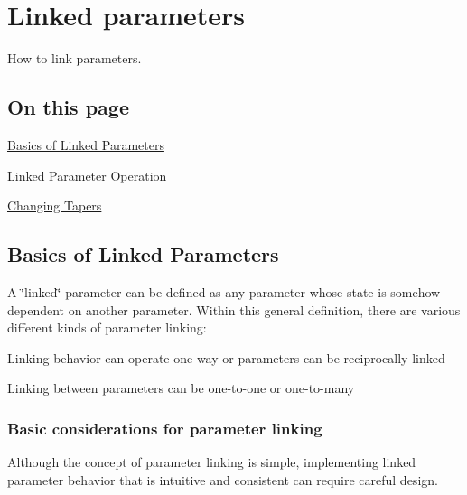 \hypertarget{a00354}{}\section{Linked parameters}
\label{a00354}
How to link parameters. 

\hypertarget{a00354_linkedParameters_contents}{}\subsection{On this page}\label{a00354_linkedParameters_contents}
\begin{DoxyItemize}
\item \hyperlink{a00354_linkedParameters_basics}{Basics of Linked Parameters} \item \hyperlink{a00354_linkedParameters_linkedParameterOperation}{Linked Parameter Operation} \item \hyperlink{a00354_linkedParameters_changingTapers}{Changing Tapers}\end{DoxyItemize}
\hypertarget{a00354_linkedParameters_basics}{}\subsection{Basics of Linked Parameters}\label{a00354_linkedParameters_basics}
A \char`\"{}linked\char`\"{} parameter can be defined as any parameter whose state is somehow dependent on another parameter. Within this general definition, there are various different kinds of parameter linking\+:


\begin{DoxyItemize}
\item Linking behavior can operate one-\/way or parameters can be reciprocally linked
\item Linking between parameters can be one-\/to-\/one or one-\/to-\/many
\end{DoxyItemize}\hypertarget{a00354_linkedParameters_considerations}{}\subsubsection{Basic considerations for parameter linking}\label{a00354_linkedParameters_considerations}
Although the concept of parameter linking is simple, implementing linked parameter behavior that is intuitive and consistent can require careful design.


